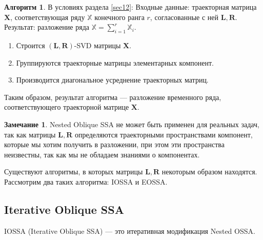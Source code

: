\documentclass[specialist, substylefile = spbureport.rtx, subf,href,colorlinks=true, 12pt]{disser}
\theoremstyle{definition}
\newtheorem{algorithm}{Алгоритм}
\newtheorem{remark}{Замечание}
\begin{document}
\begin{algorithm}
    В условиях раздела \ref{sec12}:
    Входные данные: траекторная матрица $\mathbf{X}$, соответствующая ряду $\mathbb{X}$ конечного ранга $r$, согласованные с ней $\mathbf{L}, \mathbf{R}$.\\
    Результат: разложение ряда $\mathbb{X} = \sum_{i = 1}^{r}\mathbb{X}_i$.
\end{algorithm}
    \begin{enumerate}
        \item Строится $(\mathbf{L}, \mathbf{R})$-SVD матрицы $\mathbf{X}$.
        \item Группируются траекторные матрицы элементарных компонент.
        \item Производится диагональное усреднение траекторных матриц.
    \end{enumerate}
    Таким образом, результат алгоритма --- разложение временного ряда, соответствующего траекторной матрице $\mathbf{X}$.
    \begin{remark}
    Nested Oblique SSA не может быть применен для реальных задач, так как матрицы $\mathbf{L}, \mathbf{R}$ определяются траекторными пространствами компонент, которые мы хотим получить в разложении, при этом эти пространства неизвестны, так как мы не обладаем знаниями о компонентах.
    \end{remark}
    Существуют алгоритмы, в которых матрицы $\mathbf{L}, \mathbf{R}$ некоторым образом находятся. Рассмотрим два таких алгоритма: IOSSA и EOSSA.
\subsection{Iterative Oblique SSA}
    IOSSA (Iterative Oblique SSA) --- это итеративная модификация Nested OSSA.
\end{document}
